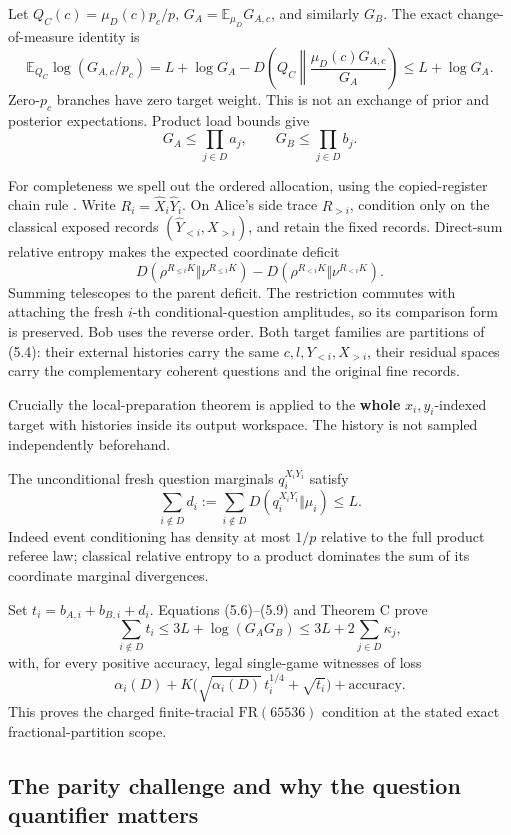\documentclass[11pt,reqno]{amsart}
\numberwithin{equation}{section}
\begin{document}
Let \(Q_C(c)=\mu_D(c)p_c/p\), \(G_A=\mathbb E_{\mu_D}G_{A,c}\), and similarly \(G_B\). The exact change-of-measure identity is \[
 \mathbb E_{Q_C}\log(G_{A,c}/p_c)
 =L+\log G_A
       -D\!\left(Q_C\middle\Vert
                  \frac{\mu_D(c)G_{A,c}}{G_A}\right)
 \le L+\log G_A. \tag{5.7}
\] Zero-\(p_c\) branches have zero target weight. This is not an exchange of prior and posterior expectations. Product load bounds give \[
 G_A\le\prod_{j\in D}a_j,\qquad
 G_B\le\prod_{j\in D}b_j. \tag{5.8}
\]

For completeness we spell out the ordered allocation, using the copied-register chain rule \cite[Lemma 2.24]{Jain}. Write \(R_i=\widehat X_i\widehat Y_i\). On Alice's side trace \(R_{>i}\), condition only on the classical exposed records \((\widehat Y_{<i},X_{>i})\), and retain the fixed records. Direct-sum relative entropy makes the expected coordinate deficit \[
 D(\rho^{R_{\le i}K}\Vert\nu^{R_{\le i}K})
 -D(\rho^{R_{<i}K}\Vert\nu^{R_{<i}K}).
\] Summing telescopes to the parent deficit. The restriction commutes with attaching the fresh \(i\)-th conditional-question amplitudes, so its comparison form is preserved. Bob uses the reverse order. Both target families are partitions of (5.4): their external histories carry the same \(c,l,Y_{<i},X_{>i}\), their residual spaces carry the complementary coherent questions and the original fine records.

Crucially the local-preparation theorem is applied to the \textbf{whole} \(x_i,y_i\)-indexed target with histories inside its output workspace. The history is not sampled independently beforehand.

The unconditional fresh question marginals \(q_i^{X_iY_i}\) satisfy \[
 \sum_{i\notin D}d_i
 :=\sum_{i\notin D}D(q_i^{X_iY_i}\Vert\mu_i)\le L. \tag{5.9}
\] Indeed event conditioning has density at most \(1/p\) relative to the full product referee law; classical relative entropy to a product dominates the sum of its coordinate marginal divergences.

Set \(t_i=b_{A,i}+b_{B,i}+d_i\). Equations (5.6)--(5.9) and Theorem C prove \[
 \boxed{\sum_{i\notin D}t_i
 \le3L+\log(G_AG_B)
 \le3L+2\sum_{j\in D}\kappa_j,} \tag{5.10}
\] with, for every positive accuracy, legal single-game witnesses of loss \[
 \alpha_i(D)+K\big(\sqrt{\alpha_i(D)}\,t_i^{1/4}+\sqrt{t_i}\big)
       +\text{accuracy}. \tag{5.11}
\] This proves the charged finite-tracial \(\mathrm{FR}(65536)\) condition at the stated exact fractional-partition scope.

\subsection{The parity challenge and why the question quantifier matters}\label{the-parity-challenge-and-why-the-question-quantifier-matters}
\end{document}
